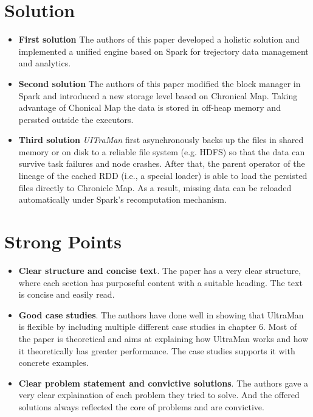 \documentclass[10pt]{proc}
\begin{document}
\section{Solution}
\begin{itemize}
	\item \textbf{First solution}
		The authors of this paper developed a holistic solution and implemented a unified engine based on Spark for trejectory data management and analytics.
	\item \textbf{Second solution}
	  	The authors of this paper modified the block manager in Spark and introduced a new storage level based on Chronical Map. Taking advantage of Chonical Map the data is stored in off-heap memory and perssted outside the executors.
	\item \textbf{Third solution}
	\textit{UITraMan} first asynchronously backs up the files in shared memory or on disk to a reliable file system (e.g. HDFS) so that the data can survive task failures and node crashes. After that, the parent operator of the lineage of the cached RDD (i.e., a special loader) is able to load the persisted files directly to Chronicle Map. As a result, missing data can be reloaded automatically under Spark's recomputation mechanism.
\end{itemize}

\section{Strong Points}
\begin{itemize}
 \item \textbf{Clear structure and concise text}. The paper has a very clear structure, where each section has purposeful content with a suitable heading. The text is concise and easily read.
 \item \textbf{Good case studies}. The authors have done well in showing that UltraMan is flexible by including multiple different case studies in chapter 6. Most of the paper is theoretical and aims at explaining how UltraMan works and how it theoretically has greater performance. The case studies supports it with concrete examples.
 \item \textbf{Clear problem statement and convictive solutions}. The authors gave a very clear explaination of each problem they tried to solve. And the offered solutions always reflected the core of problems and are convictive.
\end{itemize}
\end{document}
